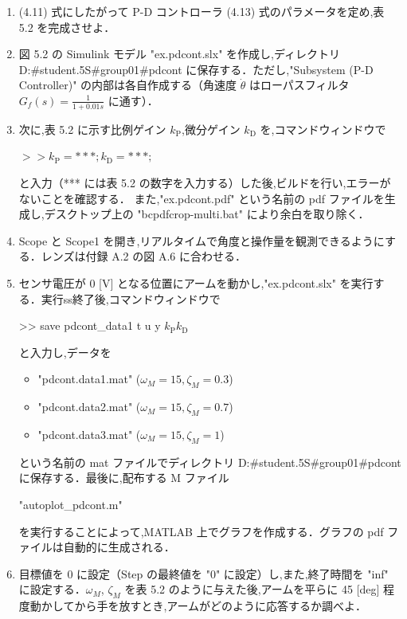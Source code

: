 \begin{enumerate}
  \item (4.11) 式にしたがって P-D コントローラ (4.13) 式のパラメータを定め,表 5.2 を完成させよ．
        
  \item 図 5.2 の Simulink モデル "ex.pdcont.slx" を作成し,ディレクトリ D:\#student.5S\#group01\#pdcont に保存する．ただし,"Subsystem (P-D Controller)" の内部は各自作成する（角速度 $\dot{\theta}$ はローパスフィルタ $G_f(s) = \frac{1}{1 + 0.01s}$ に通す）．
        
  \item 次に,表 5.2 に示す比例ゲイン $k_{\mathrm{P}}$,微分ゲイン $k_{\mathrm{D}}$ を,コマンドウィンドウで
        
        \(>> k_{\mathrm{P}} = ***; k_{\mathrm{D}} = ***;\)
        
        と入力（*** には表 5.2 の数字を入力する）した後,ビルドを行い,エラーがないことを確認する．
        また,"ex.pdcont.pdf" という名前の pdf ファイルを生成し,デスクトップ上の 
        "bcpdfcrop-multi.bat" により余白を取り除く．
        
  \item Scope と Scope1 を開き,リアルタイムで角度と操作量を観測できるようにする．レンズは付録 A.2 の図 A.6 に合わせる．
        
  \item センサ電圧が 0 [V] となる位置にアームを動かし,"ex.pdcont.slx" を実行する．実行ss終了後,コマンドウィンドウで
        
        
        >> save pdcont\_data1 t u y \(k_{\mathrm{P}} k_{\mathrm{D}}\)
        
        
        と入力し,データを
        
        \begin{itemize}
          \item "pdcont.data1.mat" ($\omega_M = 15, \zeta_M = 0.3$)
          \item "pdcont.data2.mat" ($\omega_M = 15, \zeta_M = 0.7$)
          \item "pdcont.data3.mat" ($\omega_M = 15, \zeta_M = 1$)
        \end{itemize}
        
        という名前の mat ファイルでディレクトリ D:\#student.5S\#group01\#pdcont に保存する．最後に,配布する M ファイル
        
        "autoplot\_pdcont.m"
        
        を実行することによって,MATLAB 上でグラフを作成する．グラフの pdf ファイルは自動的に生成される．
        
  \item 目標値を 0 に設定（Step の最終値を "0" に設定）し,また,終了時間を "inf" に設定する．$\omega_M$, $\zeta_M$ を表 5.2 のように与えた後,アームを平らに 45 [deg] 程度動かしてから手を放すとき,アームがどのように応答するか調べよ．
\end{enumerate}


